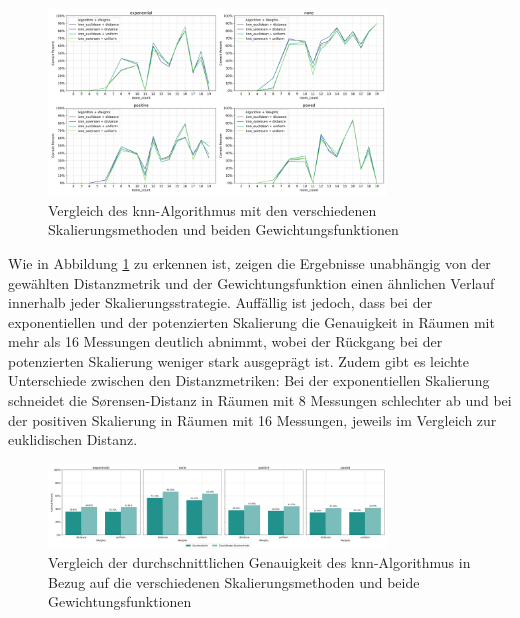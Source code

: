 \begin{figure}[H]
    \centering
    \includegraphics[width=0.8\textwidth]{images/10_knn_weights_value_scaling_strategy_03.png}
    \caption{Vergleich des \gls{knn}-Algorithmus mit den verschiedenen Skalierungsmethoden und beiden Gewichtungsfunktionen}
    \label{fig:10_knn_weights_value_scaling_strategy_03}
\end{figure}

Wie in Abbildung \ref{fig:10_knn_weights_value_scaling_strategy_03} zu erkennen ist, zeigen die Ergebnisse unabhängig von der gewählten Distanzmetrik und der Gewichtungsfunktion einen ähnlichen Verlauf innerhalb jeder Skalierungsstrategie. Auffällig ist jedoch, dass bei der exponentiellen und der potenzierten Skalierung die Genauigkeit in Räumen mit mehr als 16 Messungen deutlich abnimmt, wobei der Rückgang bei der potenzierten Skalierung weniger stark ausgeprägt ist. Zudem gibt es leichte Unterschiede zwischen den Distanzmetriken: Bei der exponentiellen Skalierung schneidet die Sørensen-Distanz in Räumen mit 8 Messungen schlechter ab und bei der positiven Skalierung in Räumen mit 16 Messungen, jeweils im Vergleich zur euklidischen Distanz.

\begin{figure}[H]
    \centering
    \includegraphics[width=0.8\textwidth]{images/10_knn_weights_value_scaling_strategy_02.png}
    \caption{Vergleich der durchschnittlichen Genauigkeit des \gls{knn}-Algorithmus in Bezug auf die verschiedenen Skalierungsmethoden und beide Gewichtungsfunktionen}
    \label{fig:10_knn_weights_value_scaling_strategy_02}
\end{figure}

